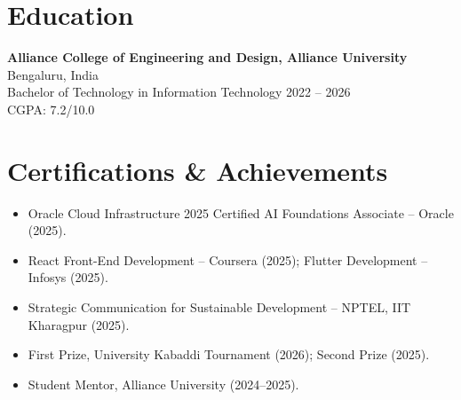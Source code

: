 \documentclass[10pt,a4paper]{article}
\newcommand{\resumeItem}[1]{\item\small{#1}}
\begin{document}
\section{Education}
\textbf{Alliance College of Engineering and Design, Alliance University} \hfill Bengaluru, India\\
Bachelor of Technology in Information Technology \hfill 2022 -- 2026\\
CGPA: 7.2/10.0

\section{Certifications \& Achievements}
\begin{itemize}
  \resumeItem{Oracle Cloud Infrastructure 2025 Certified AI Foundations Associate -- Oracle (2025).}
  \resumeItem{React Front-End Development -- Coursera (2025); Flutter Development -- Infosys (2025).}
  \resumeItem{Strategic Communication for Sustainable Development -- NPTEL, IIT Kharagpur (2025).}
  \resumeItem{First Prize, University Kabaddi Tournament (2026); Second Prize (2025).}
  \resumeItem{Student Mentor, Alliance University (2024--2025).}
\end{itemize}
\end{document}
